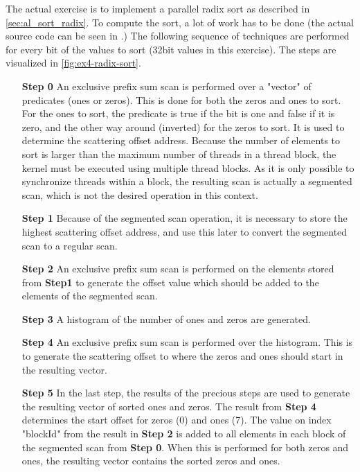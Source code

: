 The actual exercise is to implement a parallel radix sort as described in \autoref{sec:al_sort_radix}.
To compute the sort, a lot of work has to be done (the actual source code can be seen in \cite{exercises}.)
The following sequence of techniques are performed for every bit of the values to sort (32bit values in this exercise).
The steps are visualized in \autoref{fig:ex4-radix-sort}.
\begin{enumerate}
	\item[\textbf{Step 0}]
	An exclusive prefix sum scan is performed over a "vector" of predicates (ones or zeros).
	This is done for both the zeros and ones to sort.
	For the ones to sort, the predicate is true if the bit is one and false if it is zero, and the other way around (inverted) for the zeros to sort.
	It is used to determine the scattering offset address.
	Because the number of elements to sort is larger than the maximum number of threads in a thread block, the kernel must be executed using multiple thread blocks.
	As it is only possible to synchronize threads within a block, the resulting scan is actually a segmented scan, which is not the desired operation in this context.
	\item[\textbf{Step 1}]
	Because of the segmented scan operation, it is necessary to store the highest scattering offset address, and use this later to convert the segmented scan to a regular scan. 
	\item[\textbf{Step 2}]
	An exclusive prefix sum scan is performed on the elements stored from \textbf{Step1} to generate the offset value which should be added to the elements of the segmented scan.
	\item[\textbf{Step 3}]
	A histogram of the number of ones and zeros are generated.
	\item[\textbf{Step 4}]
	An exclusive prefix sum scan is performed over the histogram.
	This is to generate the scattering offset to where the zeros and ones should start in the resulting vector.
	\item[\textbf{Step 5}]
	In the last step, the results of the precious steps are used to generate the resulting vector of sorted ones and zeros.
	The result from \textbf{Step 4} determines the start offset for zeros (0) and ones (7).	
	The value on index "blockId" from the result in \textbf{Step 2} is added to all elements in each block of the segmented scan from \textbf{Step 0}.
	When this is performed for both zeros and ones, the resulting vector contains the sorted zeros and ones.
\end{enumerate}
